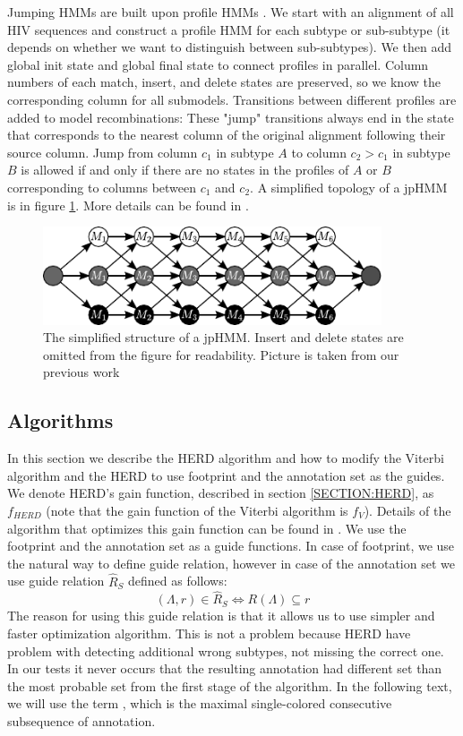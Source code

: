 Jumping HMMs are built upon profile HMMs \cite{Schultz2006}. We start with an
alignment of all HIV sequences and construct a profile HMM for each subtype or
sub-subtype (it depends on whether we want to distinguish between
sub-subtypes).  We then add global init state and global final state to connect
profiles in parallel.  Column numbers of each match, insert, and delete states
are preserved, so we know the corresponding column for all submodels.
Transitions between different profiles are added to model recombinations: These
"jump" transitions always end in the state that corresponds to the nearest
column of the original alignment following their source column. Jump from
column $c_1$ in subtype $A$ to column $c_2>c_1$ in subtype $B$ is allowed if
and only if there are no states in the profiles of $A$ or $B$ corresponding to columns
between $c_1$ and $c_2$. A simplified topology of a jpHMM is in figure
\ref{app:fig:jpHMM}. More details can be found in \cite{Schultz2006}.

\begin{figure}
\begin{center}
\includegraphics[width=10cm]{../figures/jumping_hmm}
\end{center}
\caption[Jumping HMM]{The simplified structure of a jpHMM. Insert and delete states
are omitted from the figure for readability. Picture is taken from our previous
work \cite{Nanasi2010mgr}}\label{app:fig:jpHMM}
\end{figure}

\subsection{Algorithms}

In this section we describe the HERD algorithm and how to modify the Viterbi
algorithm and the HERD to use footprint and the annotation set as the guides.
We denote HERD's gain function, described in section \ref{SECTION:HERD}, as
$f_{HERD}$ (note that the gain function of the Viterbi algorithm is $f_V$).
Details of the algorithm that optimizes this gain function can be found in
\cite{Nanasi2010, Nanasi2010mgr}. We use the footprint and the annotation set
as a guide functions. In case of footprint, we use the natural way to define
guide relation, however in case of the annotation set we use guide relation
$\hat{R}_S$ defined as follows: \[(\Lambda, r)\in \hat{R}_S\Leftrightarrow
R(\Lambda)\subseteq r\] The reason for using this guide relation is that it
allows us to use simpler and faster optimization algorithm. This is not a
problem because HERD have problem with detecting additional wrong subtypes, not
missing the correct one.  In our tests it never occurs that the resulting
annotation had different set than the most probable set from the first stage of
the algorithm.  In the following text, we will use the term
, which is the maximal single-colored consecutive
subsequence of annotation.

